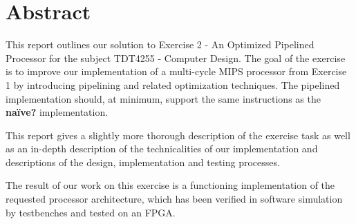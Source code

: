 \chapter*{Abstract}

This report outlines our solution to Exercise 2 - An Optimized Pipelined Processor for the subject TDT4255 - Computer Design.
The goal of the exercise is to improve our implementation of a multi-cycle MIPS processor from Exercise 1 by introducing pipelining and related optimization techniques.
The pipelined implementation should, at minimum, support the same instructions as the \textbf{naïve?} implementation.

This report gives a slightly more thorough description of the exercise task as well as an in-depth description of the technicalities of our implementation and descriptions of the design, implementation and testing processes.

The result of our work on this exercise is a functioning implementation of the requested processor architecture, which has been verified in software simulation by testbenches and tested on an FPGA.
